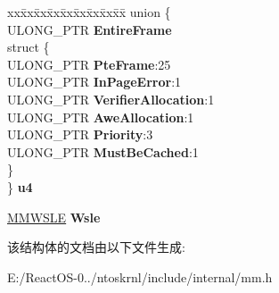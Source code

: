 \begin{DoxyCompactItemize}
\begin{tabbing}
\end{tabbing}\item 
\mbox{\label{struct___m_m_p_f_n_a769ba83093e702604827f45509a267bc}} 
\begin{tabbing}
xx\=xx\=xx\=xx\=xx\=xx\=xx\=xx\=xx\=\kill
union \{\\
\>ULONG\_PTR {\bfseries EntireFrame}\\
\mbox{\label{union___m_m_p_f_n_1_1_0D1449_a078db55205c4dd2c6b699eb7c5131167}} 
\>struct \{\\
\>\>ULONG\_PTR {\bfseries PteFrame}:25\\
\>\>ULONG\_PTR {\bfseries InPageError}:1\\
\>\>ULONG\_PTR {\bfseries VerifierAllocation}:1\\
\>\>ULONG\_PTR {\bfseries AweAllocation}:1\\
\>\>ULONG\_PTR {\bfseries Priority}:3\\
\>\>ULONG\_PTR {\bfseries MustBeCached}:1\\
\>\} \\
\} {\bfseries u4}\\

\end{tabbing}\item 
\mbox{\label{struct___m_m_p_f_n_a26cbbed1fd3a4dbdb46f5abc8f3bb6c5}} 
\hyperlink{struct___m_m_w_s_l_e}{M\+M\+W\+S\+LE} {\bfseries Wsle}
\end{DoxyCompactItemize}


该结构体的文档由以下文件生成\+:\begin{DoxyCompactItemize}
\item 
E\+:/\+React\+O\+S-\/0../ntoskrnl/include/internal/mm.\+h\end{DoxyCompactItemize}
